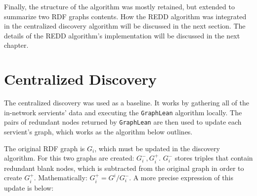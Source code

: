 
\vspace{1cm}

Finally, the structure of the algorithm was mostly retained, but extended to summarize two RDF graphs contents. How the REDD algorithm was integrated in the centralized discovery algorithm will be discussed in the next section. The details of the REDD algorithm's implementation will be discussed in the next chapter.



\section{Centralized Discovery}
The centralized discovery was used as a baseline. It works by gathering all of the in-network servients' data and executing the \texttt{GraphLean} algorithm locally. The pairs of redundant nodes returned by \texttt{GraphLean} are then used to update each servient's graph, which works as the algorithm below outlines.

The original RDF graph is $G_{i}$, which must be updated in the discovery algorithm. For this two graphs are created: $G^{-}_{i}, G^{+}_{i}$. $G^{-}_{i}$ stores triples that contain redundant blank nodes, which is subtracted from the original graph in order to create $G^{+}_{i}$. Mathematically: $G^{+}_{i} = G^{i}/G^{-}_{i}$. A more precise expression of this update is below:

